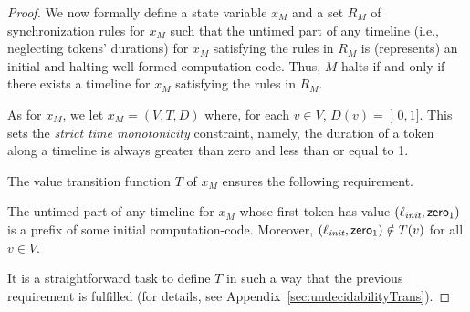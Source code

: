 \begin{proof}
We now formally define a state variable $x_M$ and a set $R_M$ of synchronization rules for $x_M$ such that the untimed part of any timeline (i.e., neglecting tokens' durations)
for $x_M$ satisfying the rules in $R_M$ is (represents) an initial and halting well-formed computation-code. Thus, $M$ halts if and only if there exists a timeline for $x_M$ satisfying the rules in $R_M$.

As for $x_M$, we let $x_M= (V,T,D)$ where, for each $v\in V$, 
$D(v)=\mathopen]0,1\mathclose]$. This sets the \emph{strict time monotonicity} constraint, namely, the duration of a token along a timeline is always greater than zero and less than or equal to 1. 

The value transition function $T$ of $x_M$ ensures the following requirement.
\begin{claim}\label{ref:claim}
The untimed part of any timeline for $x_M$ whose first token has value $(\ell_{\textit{init}},{\mathsf{zero}}_1)$
 is a prefix of some initial computation-code. Moreover, $(\ell_{\textit{init}},{\mathsf{zero}}_1)\notin T(v)$ for all $v\in V$.
\end{claim}
It is a straightforward task to define $T$ in  such a way that the previous requirement is fulfilled (for details, see Appendix~\ref{sec:undecidabilityTrans}).
 

\end{proof}
